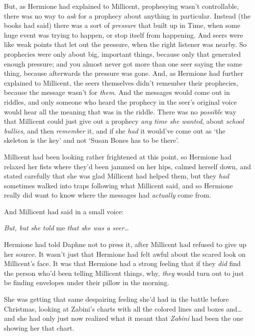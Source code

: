 But, as Hermione had explained to Millicent, prophesying wasn't controllable, there was no way to \emph{ask} for a prophecy about anything in particular. Instead (the books had said) there was a sort of \emph{pressure} that built up in Time, when some huge event was trying to happen, or stop itself from happening. And seers were like weak points that let out the pressure, when the right listener was nearby. So prophecies were only about big, important things, because only that generated enough pressure; and you almost never got more than one seer saying the same thing, because afterwards the pressure was gone. And, as Hermione had further explained to Millicent, the seers themselves didn't remember their prophecies, because the message wasn't for \emph{them}. And the messages would come out in riddles, and only someone who heard the prophecy in the seer's original voice would hear all the meaning that was in the riddle. There was no \emph{possible} way that Millicent could just give out a prophecy \emph{any time she wanted}, about \emph{school bullies}, and then \emph{remember} it, and if she \emph{had} it would've come out as `the skeleton is the key' and not `Susan Bones has to be there'.

Millicent had been looking rather frightened at this point, so Hermione had relaxed her fists where they'd been jammed on her hips, calmed herself down, and stated carefully that she was glad Millicent had helped them, but they \emph{had} sometimes walked into traps following what Millicent said, and so Hermione really did want to know where the messages had \emph{actually} come from.

And Millicent had said in a small voice:

\emph{But, but she told} me \emph{that she was a seer{\ldots}}

Hermione had told Daphne not to press it, after Millicent had refused to give up her source. It wasn't just that Hermione had felt awful about the scared look on Millicent's face. It was that Hermione had a strong feeling that if they \emph{did} find the person who'd been telling Millicent things, why, \emph{they} would turn out to just be finding envelopes under their pillow in the morning.

She was getting that same despairing feeling she'd had in the battle before Christmas, looking at Zabini's charts with all the colored lines and boxes and{\ldots} and she had only just now realized what it meant that \emph{Zabini} had been the one showing her that chart.

